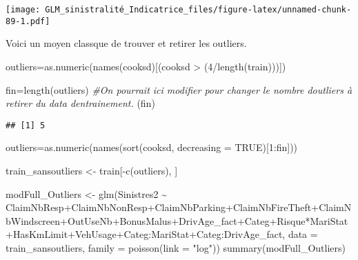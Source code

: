 \documentclass[
]{article}
\newenvironment{Shaded}{\begin{snugshade}}{\end{snugshade}}
\newcommand{\AttributeTok}[1]{\textcolor[rgb]{0.77,0.63,0.00}{#1}}
\newcommand{\CommentTok}[1]{\textcolor[rgb]{0.56,0.35,0.01}{\textit{#1}}}
\newcommand{\ConstantTok}[1]{\textcolor[rgb]{0.00,0.00,0.00}{#1}}
\newcommand{\DecValTok}[1]{\textcolor[rgb]{0.00,0.00,0.81}{#1}}
\newcommand{\FunctionTok}[1]{\textcolor[rgb]{0.00,0.00,0.00}{#1}}
\newcommand{\NormalTok}[1]{#1}
\newcommand{\OtherTok}[1]{\textcolor[rgb]{0.56,0.35,0.01}{#1}}
\newcommand{\SpecialCharTok}[1]{\textcolor[rgb]{0.00,0.00,0.00}{#1}}
\newcommand{\StringTok}[1]{\textcolor[rgb]{0.31,0.60,0.02}{#1}}
\begin{document}
\texttt{[image: GLM\_sinistralité\_Indicatrice\_files/figure-latex/unnamed-chunk-89-1.pdf]}

Voici un moyen classque de trouver et retirer les outliers.

\begin{Shaded}
\begin{Highlighting}[]
\NormalTok{outliers}\OtherTok{=}\FunctionTok{as.numeric}\NormalTok{(}\FunctionTok{names}\NormalTok{(cooksd)[(cooksd }\SpecialCharTok{\textgreater{}}\NormalTok{ (}\DecValTok{4}\SpecialCharTok{/}\FunctionTok{length}\NormalTok{(train)))])}

\NormalTok{fin}\OtherTok{=}\FunctionTok{length}\NormalTok{(outliers) }\CommentTok{\#On pourrait ici modifier pour changer le nombre d\textquotesingle{}outliers à retirer du data d\textquotesingle{}entrainement.}
\NormalTok{(fin)}
\end{Highlighting}
\end{Shaded}

\begin{verbatim}
## [1] 5
\end{verbatim}

\begin{Shaded}
\begin{Highlighting}[]
\NormalTok{outliers}\OtherTok{=}\FunctionTok{as.numeric}\NormalTok{(}\FunctionTok{names}\NormalTok{(}\FunctionTok{sort}\NormalTok{(cooksd, }\AttributeTok{decreasing =} \ConstantTok{TRUE}\NormalTok{)[}\DecValTok{1}\SpecialCharTok{:}\NormalTok{fin]))}

\NormalTok{train\_sansoutliers }\OtherTok{\textless{}{-}}\NormalTok{ train[}\SpecialCharTok{{-}}\FunctionTok{c}\NormalTok{(outliers), ]}

\NormalTok{modFull\_Outliers }\OtherTok{\textless{}{-}} \FunctionTok{glm}\NormalTok{(Sinistres2 }\SpecialCharTok{\textasciitilde{}}\NormalTok{ ClaimNbResp}\SpecialCharTok{+}\NormalTok{ClaimNbNonResp}\SpecialCharTok{+}\NormalTok{ClaimNbParking}\SpecialCharTok{+}\NormalTok{ClaimNbFireTheft}\SpecialCharTok{+}\NormalTok{ClaimNbWindscreen}\SpecialCharTok{+}\NormalTok{OutUseNb}\SpecialCharTok{+}\NormalTok{BonusMalus}\SpecialCharTok{+}\NormalTok{DrivAge\_fact}\SpecialCharTok{+}\NormalTok{Categ}\SpecialCharTok{+}\NormalTok{Risque}\SpecialCharTok{*}\NormalTok{MariStat}\SpecialCharTok{+}\NormalTok{HasKmLimit}\SpecialCharTok{+}\NormalTok{VehUsage}\SpecialCharTok{+}\NormalTok{Categ}\SpecialCharTok{:}\NormalTok{MariStat}\SpecialCharTok{+}\NormalTok{Categ}\SpecialCharTok{:}\NormalTok{DrivAge\_fact, }\AttributeTok{data =}\NormalTok{ train\_sansoutliers, }\AttributeTok{family =} \FunctionTok{poisson}\NormalTok{(}\AttributeTok{link =} \StringTok{"log"}\NormalTok{))}
\FunctionTok{summary}\NormalTok{(modFull\_Outliers)}
\end{Highlighting}
\end{Shaded}
\end{document}
